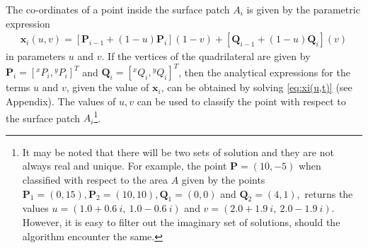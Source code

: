 \documentclass[12pt,a4]{article}
\begin{document}
The co-ordinates of a point inside the surface patch $A_i$ is given by the parametric expression
\begin{align}
\label{eq:xi(u,t)}
\mathbf{x}_i(u,v)= \left[ \mathbf{P}_{i-1}+\left(1-{u} \right)\mathbf{P}_i  \right]\left(1-{v}\right) +\left[\mathbf{ Q}_{i-1}+\left(1-{u} \right)\mathbf{Q}_i  \right]\left({v}\right)
\end{align}
in parameters $u$ and $v$. If the vertices of the quadrilateral are given by $\mathbf{P}_{i}=\left[ {}^xP_{i},{}^yP_{i}\right]^T $ and $\mathbf{Q}_{i}=\left[ {}^xQ_{i},{}^yQ_{i}\right]^T $, then the analytical expressions for the terms $u$ and ${v}$, given the value of $\mathbf{x}_i$, can be obtained by solving \ref{eq:xi(u,t)} (see Appendix). The values of $u,v$ can be used to classify the point with respect to the surface patch $A_i$\footnote{It may be noted that there will be two sets of solution and they are not always real and unique. For example, the point $\mathbf{P} =\left(10,-5 \right)$ when classified with respect to the area $A$ given by the points $\mathbf{P}_1 = \left(0,15 \right),\mathbf{P}_2 = \left(10,10 \right),\mathbf{Q}_1 = \left(0,0 \right)$ and $\mathbf{Q}_2 = \left(4,1 \right),$ returns the values $u=\left( 1.0 + 0.6~i,~1.0 - 0.6~i \right)$ and $v=\left(2.0 + 1.9~i,~2.0 - 1.9~i\right)$. However, it is easy to filter out the imaginary set of solutions, should the algorithm encounter the same.}.
\end{document}
